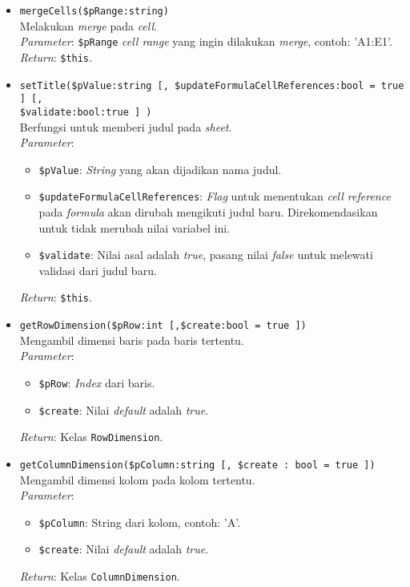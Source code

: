 \begin{itemize}
	\item \texttt{mergeCells(\$pRange:string)} \\ 
	Melakukan \textit{merge} pada \textit{cell}. \\ 
	\textit{Parameter}: \texttt{\$pRange} \textit{cell range} yang ingin dilakukan \textit{merge}, contoh: 'A1:E1'. \\
	\textit{Return}: \texttt{\$this}.
	\item \texttt{setTitle(\$pValue:string [, \$updateFormulaCellReferences:bool = true ] [, \\ \$validate:bool:true ] )}\\
	 Berfungsi untuk memberi judul pada \textit{sheet}. \\
	 \textit{Parameter}:
	 \begin{itemize}
	 	\item \texttt{\$pValue}: \textit{String} yang akan dijadikan nama judul.
	 	\item \texttt{\$updateFormulaCellReferences}: \textit{Flag} untuk menentukan \textit{cell reference} pada \textit{formula} akan dirubah mengikuti judul baru. Direkomendasikan untuk tidak merubah nilai variabel ini.
	 	\item \texttt{\$validate}: Nilai asal adalah \textit{true}, pasang nilai \textit{false} untuk melewati validasi dari judul baru.
	 \end{itemize}
 	\textit{Return}: \texttt{\$this}.
	\item \texttt{getRowDimension(\$pRow:int [,\$create:bool = true ])} \\ 
	Mengambil dimensi baris pada baris tertentu. \\
	\textit{Parameter}: 
	\begin{itemize}
		\item \texttt{\$pRow}: \textit{Index} dari baris.
		\item \texttt{\$create}: Nilai \textit{default} adalah \textit{true}.
	\end{itemize}
	\textit{Return}: Kelas \texttt{RowDimension}.
	\item \texttt{getColumnDimension(\$pColumn:string [, \$create : bool = true ])} \\
	Mengambil dimensi kolom pada kolom tertentu. \\
	\textit{Parameter}:
	\begin{itemize}
		\item \texttt{\$pColumn}: String dari kolom, contoh: 'A'.
		\item \texttt{\$create}: Nilai \textit{default} adalah \textit{true}.
	\end{itemize}
	\textit{Return}: Kelas \texttt{ColumnDimension}.
\end{itemize}

